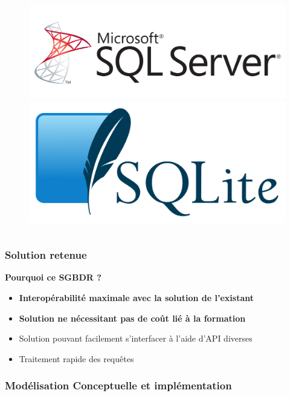 \begin{frame}
\begin{columns}
\begin{column}{7cm}
\begin{figure}
\includegraphics[scale=0.052]{Images/MsSqlServer}
\includegraphics[scale=0.052]{Images/SQLite}
\end{figure}
\end{column}
\end{columns}
\end{frame}

\begin{frame}
\frametitle{Solution retenue}
\begin{block}{\textbf{Pourquoi ce SGBDR ?}}
\begin{itemize}
 \item<2-> \textbf{Interopérabilité maximale avec la solution de l'existant}
 \item<3-> \textbf{Solution ne nécessitant pas de coût lié à la formation}
 \item<4-> Solution pouvant facilement s'interfacer à l'aide d'API diverses
 \item<5-> Traitement rapide des requêtes
\end{itemize}
\end{block}
\end{frame}

\subsubsection[Modélisation Conceptuelle et implémentation]{Modélisation Conceptuelle et implémentation}

